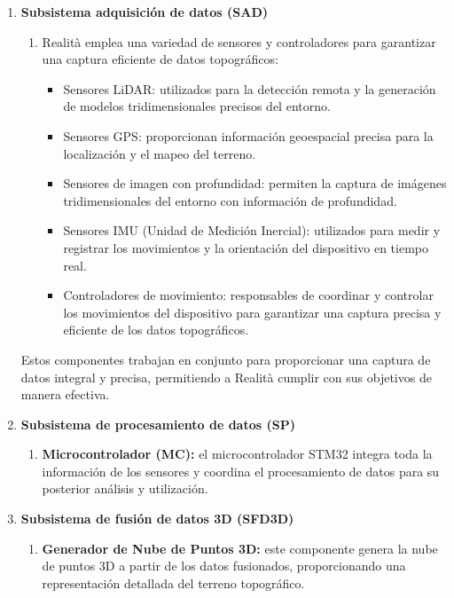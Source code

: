 \documentclass[12pt,a4paper, twoside]{article} %
\begin{document}
\begin{enumerate}

\item \textbf{Subsistema adquisición de datos (SAD)}
\begin{enumerate}
\item Realità emplea una variedad de sensores y controladores para garantizar una captura eficiente de datos topográficos:
\begin{itemize}
\item Sensores LiDAR: utilizados para la detección remota y la generación de modelos tridimensionales precisos del entorno.
\item Sensores GPS: proporcionan información geoespacial precisa para la localización y el mapeo del terreno.
\item Sensores de imagen con profundidad: permiten la captura de imágenes tridimensionales del entorno con información de profundidad.
\item Sensores IMU (Unidad de Medición Inercial): utilizados para medir y registrar los movimientos y la orientación del dispositivo en tiempo real.
\item Controladores de movimiento: responsables de coordinar y controlar los movimientos del dispositivo para garantizar una captura precisa y eficiente de los datos topográficos.
\end{itemize}

\end{enumerate}

Estos componentes trabajan en conjunto para proporcionar una captura de datos integral y precisa, permitiendo a Realità cumplir con sus objetivos de manera efectiva.

\item \textbf{Subsistema de procesamiento de datos (SP)}
\begin{enumerate}

\item \textbf{Microcontrolador (MC):} el microcontrolador STM32 integra toda la información de los sensores y coordina el procesamiento de datos para su posterior análisis y utilización.
\end{enumerate}

\item \textbf{Subsistema de fusión de datos 3D (SFD3D)}
\begin{enumerate}

\item \textbf{Generador de Nube de Puntos 3D:} este componente genera la nube de puntos 3D a partir de los datos fusionados, proporcionando una representación detallada del terreno topográfico.


\end{enumerate}
\end{enumerate}
\end{document}
